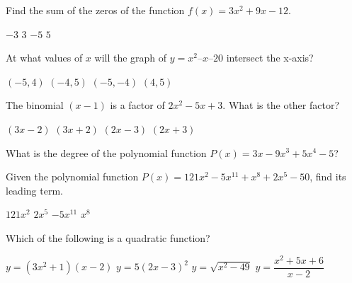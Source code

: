\begin{questions}

\question Find the sum of the zeros of the function $f(x) =3x^2+9x-12$.  

\begin{multicols}{4}
\begin{choices} 
\CorrectChoice $-3$
\choice $3$
\choice $-5$
\choice $5$
\end{choices} 
\end{multicols}

\question At what values of $x$ will the graph of $y = x^2 – x – 20$ intersect the x-axis?
\begin{multicols}{4}
\begin{choices}  
\choice $(-5,4)$ 
\CorrectChoice $(-4,5)$
\choice $(-5,-4)$
\choice  $(4,5)$
\end{choices}
\end{multicols}

\question The binomial $(x-1)$ is a factor of $2x^2 - 5x + 3$. What is the other factor?
\begin{multicols}{4}
\begin{choices}  
\choice $(3x-2)$
\choice $(3x+2)$
\CorrectChoice $(2x-3)$
\choice $(2x+3)	$
\end{choices}
\end{multicols}

\question What is the degree of the polynomial function $P(x) = 3x - 9x^3 + 5x^4 -5$?  
\begin{multicols}{4}
\begin{choices}  
\end{choices}
\end{multicols}

\question Given the polynomial function $P(x) = 121x^2 - 5x^{11} + x^8 + 2x^5 - 50$, find its  leading term.
\begin{multicols}{4}
\begin{choices}  
\choice $121x^2$
\choice $2x^5$
\CorrectChoice $- 5x^{11} $
\choice $x^8$
\end{choices}
\end{multicols} 

\question Which of the following is a quadratic function?
\begin{multicols}{2}
\begin{choices}  
\choice $y=(3x^2+1)(x-2)$
\CorrectChoice $y=5(2x-3)^2$
\choice $y=\sqrt{x^2-49} $
\choice $y=\dfrac{x^2+5x+6}{x-2} $
\end{choices}
\end{multicols} 


\end{questions}
